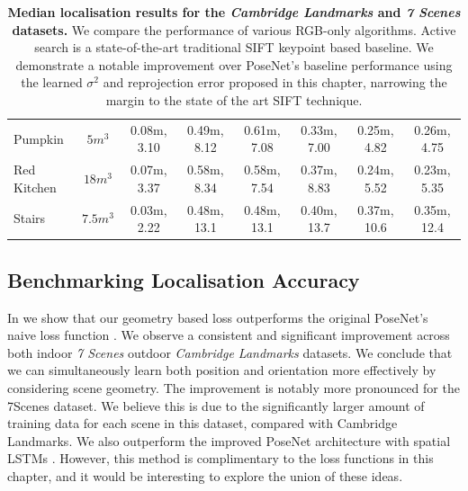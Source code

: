 {\begin{landscape}
\begin{table}[t]
\begin{center}
{\begin{tabular}{l|c|c c c c c c}
Pumpkin 	& $5m^3$ 	& 0.08m, 3.10\degree & 0.49m, 8.12\degree & 0.61m, 7.08\degree & 0.33m, 7.00\degree & 0.25m, 4.82\degree & 0.26m, 4.75\degree \\
Red Kitchen & $18m^3$	& 0.07m, 3.37\degree & 0.58m, 8.34\degree & 0.58m, 7.54\degree & 0.37m, 8.83\degree & 0.24m, 5.52\degree & 0.23m, 5.35\degree \\
Stairs 		& $7.5m^3$ 	& 0.03m, 2.22\degree & 0.48m, 13.1\degree & 0.48m, 13.1\degree & 0.40m, 13.7\degree & 0.37m, 10.6\degree & 0.35m, 12.4\degree \\
\hline
\end{tabular}}
\end{center}

	\caption[Localisation results for Cambridge Landmarks and 7 Scenes.]{\textbf{Median localisation results for the \textit{Cambridge Landmarks} \citep{kendall2015posenet} and \textit{7 Scenes} \citep{shotton2013scene} datasets.} We compare the performance of various RGB-only algorithms. Active search \citep{sattler2016efficient} is a state-of-the-art traditional SIFT keypoint based baseline. We demonstrate a notable improvement over PoseNet's \citep{kendall2015posenet} baseline performance using the learned $\sigma^2$ and reprojection error proposed in this chapter, narrowing the margin to the state of the art SIFT technique.}
	\label{tbl:mainresults}
\end{table}
\end{landscape}
\clearpage%
}

\subsection{Benchmarking Localisation Accuracy}
\label{sec:benchmark}

In  we show that our geometry based loss outperforms the original PoseNet's naive loss function \citep{kendall2015posenet}. We observe a consistent and significant improvement across both indoor \textit{7 Scenes} outdoor \textit{Cambridge Landmarks} datasets. We conclude that we can simultaneously learn both position and orientation more effectively by considering scene geometry. The improvement is notably more pronounced for the 7Scenes dataset. We believe this is due to the significantly larger amount of training data for each scene in this dataset, compared with Cambridge Landmarks. We also outperform the improved PoseNet architecture with spatial LSTMs \citep{walch2016image}. However, this method is complimentary to the loss functions in this chapter, and it would be interesting to explore the union of these ideas.

